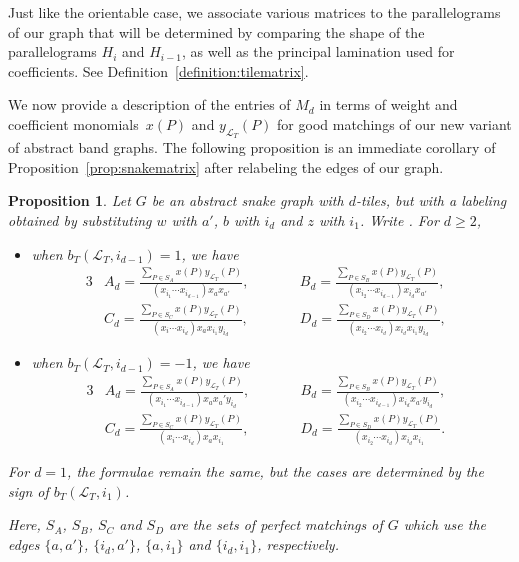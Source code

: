 \documentclass[pdftex]{sigma}
\numberwithin{equation}{section}
\newtheorem{Proposition}[Theorem]{Proposition}
\theoremstyle{definition}
\begin{document}
Just like the orientable case, we associate various matrices to the parallelograms of our graph that will be determined by comparing the shape of the parallelograms $H_i$ and $H_{i-1}$, as well as the principal lamination used for coefficients. See Definition~\ref{definition:tilematrix}.

We now provide a description of the entries of $M_d$ in terms of weight and coefficient monomials~$x(P)$ and $y_{\mathcal{L}_T}(P)$ for good matchings of our new variant of abstract band graphs. The following proposition is an immediate corollary of Proposition~\ref{prop:snakematrix} after relabeling the edges of our graph.

\begin{Proposition}\label{prop:quasibandmatrix}
Let $G$ be an abstract snake graph with $d$-tiles, but with a labeling obtained by substituting $w$ with $a'$, $b$ with $i_d$ and $z$ with $i_1$. Write .
For $d\geq 2$,
\begin{itemize}\itemsep=0pt
\item when $b_{T}(\mathcal{L}_{T}, {i_{d-1}})=1$, we have
\begin{alignat*}{3}
& A_d = \frac{\sum_{P\in S_A}x(P)y_{\mathcal{L}_T}(P)}{(x_{i_1}\cdots x_{i_{d-1}})x_ax_{a'}} ,\qquad&& B_d = \frac{\sum_{P\in S_B}x(P)y_{\mathcal{L}_T}(P)}{(x_{i_2}\cdots x_{i_{d-1}})x_{i_d}x_{a'}},\\
&C_d = \frac{\sum_{P\in S_C}x(P)y_{\mathcal{L}_T}(P)}{(x_{i}\cdots x_{i_d})x_ax_{i_1}y_{i_d}} ,\qquad&& D_d = \frac{\sum_{P\in S_D}x(P)y_{\mathcal{L}_T}(P)}{(x_{i_2}\cdots x_{i_{d}})x_{i_d}x_{i_1}y_{i_d}},&
\end{alignat*}
\item when $b_{T}(\mathcal{L}_{T}, i_{d-1})=-1$, we have
\begin{alignat*}{3}
& A_d = \frac{\sum_{P\in S_A}x(P)y_{\mathcal{L}_T}(P)}{(x_{i_1}\cdots x_{i_{d-1}})x_ax_a'y_{i_d}} ,\qquad&& B_d = \frac{\sum_{P\in S_B}x(P)y_{\mathcal{L}_T}(P)}{(x_{i_2}\cdots x_{i_{d-1}})x_{i_d}x_{a'} y_{i_d}},&\\
& C_d = \frac{\sum_{P\in S_C}x(P)y_{\mathcal{L}_T}(P)}{(x_{i}\cdots x_{i_d})x_ax_{i_1}},\qquad&& D_d = \frac{\sum_{P\in S_D}x(P)y_{\mathcal{L}_T}(P)}{(x_{i_2}\cdots x_{i_{d}})x_{i_d}x_{i_1}}.&
\end{alignat*}
\end{itemize}
\noindent For $d=1$, the formulae remain the same, but the cases are determined by the sign of $b_T(\mathcal{L}_T, i_1)$.


\noindent Here, $S_A$, $S_B$, $S_C$ and $S_D$ are the sets of perfect matchings of $G$ which use the edges $\{a, a'\}$, $ \{i_d, a'\}$, $\{a, i_1\}$ and $\{i_d, i_1\}$, respectively.
\end{Proposition}
\end{document}
